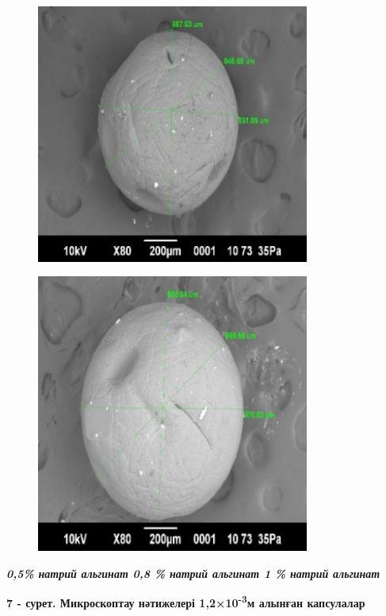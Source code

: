 \begin{figure}[H]
	\centering
	\includegraphics[width=0.8\textwidth]{media/pish/image33}
	\caption*{}
\end{figure}


\begin{figure}[H]
	\centering
	\includegraphics[width=0.8\textwidth]{media/pish/image34}
	\caption*{}
\end{figure}


\emph{{\bfseries 0,5\% натрий альгинат 0,8 \% натрий альгинат 1 \% натрий альгинат}}

{\bfseries 7 - сурет. Микроскоптау нәтижелері 1,2×10\textsuperscript{-3}м алынған капсулалар}

